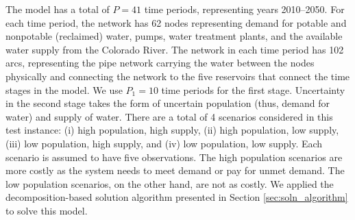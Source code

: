 \documentclass[ijoc,nonblindrev]{informs3} %
\newcommand{\x}{\mathbf{x}}
\newcommand{\y}{\mathbf{y}}
\renewcommand{\c}{\mathbf{c}}
\renewcommand{\k}{\mathbf{k}}
\renewcommand{\b}{\mathbf{b}}
\renewcommand{\d}{\mathbf{d}}
\newcommand{\plp}{$\phi$LP-2}
\begin{document}


The model has a total of $P = 41$ time periods, representing years 2010--2050. 
For each time period, the network has 62 nodes representing demand for potable and nonpotable (reclaimed) water, pumps, water treatment plants, and the available water supply from the Colorado River.
The network in each time period has 102 arcs, representing the pipe network carrying the water between the nodes physically and connecting the network to the five reservoirs that connect the time stages in the model.
We use $P_1 = 10$ time periods for the first stage.
Uncertainty in the second stage takes the form of uncertain population (thus, demand for water) and supply of water.
There are a total of 4 scenarios considered in this test instance: (i) high population, high supply, (ii) high population, low supply, (iii) low population, high supply, and (iv) low population, low supply.
Each scenario is assumed to have five observations.
The high population scenarios are more costly as the system needs to meet demand or pay for unmet demand.
The low population scenarios, on the other hand, are not as costly. 
We applied the decomposition-based solution algorithm presented in Section \ref{sec:soln_algorithm} to solve this model.%
\end{document}
